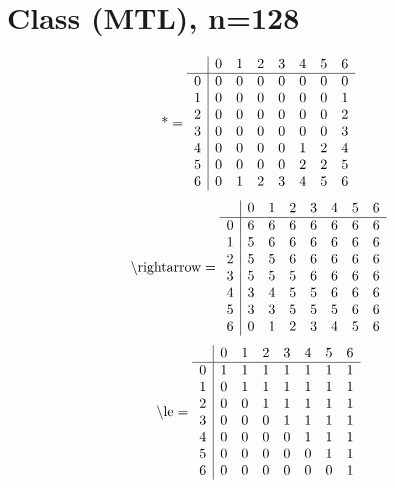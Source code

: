 \documentclass[11pt]{article}
\begin{document}
\section{Class (MTL), n=128}
\[\text{*} = 
\begin{array}{r | r r r r r r r}
 & 0 & 1 & 2 & 3 & 4 & 5 & 6 \\ \hline
0 & 0 & 0 & 0 & 0 & 0 & 0 & 0 \\
1 & 0 & 0 & 0 & 0 & 0 & 0 & 1 \\
2 & 0 & 0 & 0 & 0 & 0 & 0 & 2 \\
3 & 0 & 0 & 0 & 0 & 0 & 0 & 3 \\
4 & 0 & 0 & 0 & 0 & 1 & 2 & 4 \\
5 & 0 & 0 & 0 & 0 & 2 & 2 & 5 \\
6 & 0 & 1 & 2 & 3 & 4 & 5 & 6 \\
\end{array}
\]
\[\text{\textbackslash rightarrow} = 
\begin{array}{r | r r r r r r r}
 & 0 & 1 & 2 & 3 & 4 & 5 & 6 \\ \hline
0 & 6 & 6 & 6 & 6 & 6 & 6 & 6 \\
1 & 5 & 6 & 6 & 6 & 6 & 6 & 6 \\
2 & 5 & 5 & 6 & 6 & 6 & 6 & 6 \\
3 & 5 & 5 & 5 & 6 & 6 & 6 & 6 \\
4 & 3 & 4 & 5 & 5 & 6 & 6 & 6 \\
5 & 3 & 3 & 5 & 5 & 5 & 6 & 6 \\
6 & 0 & 1 & 2 & 3 & 4 & 5 & 6 \\
\end{array}
\]
\[\text{\textbackslash le} = 
\begin{array}{r | r r r r r r r}
 & 0 & 1 & 2 & 3 & 4 & 5 & 6 \\ \hline
0 & 1 & 1 & 1 & 1 & 1 & 1 & 1 \\
1 & 0 & 1 & 1 & 1 & 1 & 1 & 1 \\
2 & 0 & 0 & 1 & 1 & 1 & 1 & 1 \\
3 & 0 & 0 & 0 & 1 & 1 & 1 & 1 \\
4 & 0 & 0 & 0 & 0 & 1 & 1 & 1 \\
5 & 0 & 0 & 0 & 0 & 0 & 1 & 1 \\
6 & 0 & 0 & 0 & 0 & 0 & 0 & 1 \\
\end{array}
\]
\end{document}
